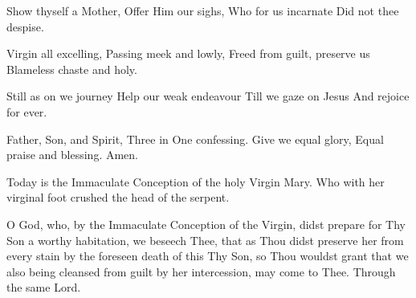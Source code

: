 {{\item Show thyself a Mother,
Offer Him our sighs,
Who for us incarnate
Did not thee despise.

\item Virgin all excelling,
Passing meek and lowly,
Freed from guilt, preserve us
Blameless chaste and holy.

\item Still as on we journey
Help our weak endeavour
Till we gaze on Jesus
And rejoice for ever.

\item Father, Son, and Spirit,
Three in One confessing.
Give we equal glory,
Equal praise and blessing.
Amen.%
}

{
\def\vrlinebreak{T}
{Today is the Immaculate Conception of the holy Virgin Mary.}
{Who with her virginal foot crushed the head of the serpent.}
}

\bigskip
{
\newcommand{\anttranslation}{This day a rod came forth from the root of Jesse: this day Mary was conceived without any stain of sin: this day the head of the old serpent was crushed by her.  Alleluia.}
\def\breakbeforeEuouae{T}
\def\noeuouae{T}
\def\preverses{\greblockcustos}
\def\dontrepeatantiphon{T}
}
{O God, who, by the Immaculate Conception of the Virgin, didst prepare for Thy Son a worthy habitation, we beseech Thee, that as Thou didst preserve her from every stain by the foreseen death of this Thy Son, so Thou wouldst grant that we also being cleansed from guilt by her intercession, may come to Thee.  Through the same Lord.}

\bigskip
\benedicamusdomino[mary]
}












